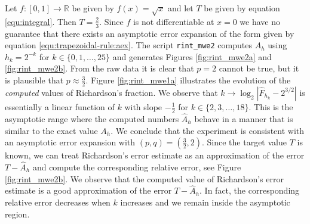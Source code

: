 \documentclass[runningheads]{llncs}
\begin{document}
Let $f : [0,1] \rightarrow \mathbb{R}$ be given by $f(x) = \sqrt{x}$ and let $T$ be given by equation \eqref{equ:integral}.
Then $T = \frac{2}{3}$. Since $f$ is not differentiable at $x=0$ we have no guarantee that there exists an asymptotic error expansion of the form given by equation \eqref{equ:trapezoidal-rule:aex}.
The script {\tt rint\_mwe2} computes $A_h$ using $h_k = 2^{-k}$ for $k \in \{0,1,\dots,25\}$ and generates Figures \ref{fig:rint_mwe2a} and \ref{fig:rint_mwe2b}.
From the raw data it is clear that $p = 2$ cannot be true, but it is plausible that $p \approx \frac{3}{2}$.
Figure \ref{fig:rint_mwe1a} illustrates the evolution of the \emph{computed} values of Richardson's fraction.
We observe that $k \rightarrow \log_2|\hat{F}_{h_k} - 2^{3/2}|$ is essentially a linear function of $k$ with slope $-\frac{1}{2}$ for $k \in \{2,3,\dots,18\}$.
This is the asymptotic range where the computed numbers $\hat{A}_h$ behave in a manner that is similar to the exact value $A_h$. 
We conclude that the experiment is consistent with an asymptotic error expansion with $(p,q)=(\tfrac{3}{2},2)$.
Since the target value $T$ is known, we can treat Richardson's error estimate as an approximation of the error $T-\hat{A}_h$ and compute the corresponding relative error, see Figure \ref{fig:rint_mwe2b}.
We observe that the computed value of Richardson's error estimate is a good approximation of the error $T - \hat{A}_h$.
In fact, the corresponding relative error decreases when $k$ increases and we remain inside the asymptotic region.
\end{document}

